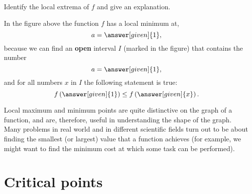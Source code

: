 \documentclass{ximera}
\begin{document}
\begin{example}
\begin{image}
\begin{tikzpicture}
\end{tikzpicture}
\end{image}
Identify the local extrema of $f$ and give an explanation.
\begin{explanation}
In the figure above the function $f$ has a local minimum at,
\[
a=\answer[given]{1},
\]
because we can find an \textbf{open} interval $I$ (marked in the
figure) that contains the number
\[
a=\answer[given]{1},
\]
and for all numbers $x$ in $I$ the following statement is true:
 \[
f\left(\answer[given]{1}\right)\le f\left(\answer[given]{x}\right).
\]
\end{explanation}
\end{example}

Local maximum and minimum points are quite distinctive on the graph of
a function, and are, therefore, useful in understanding the shape of the
graph. Many problems in real world and in different scientific fields turn out to be about
finding the smallest (or largest) value that a function achieves (for example, we might want
to find the minimum cost at which some task can be performed).



\section{Critical points}
\end{document}
